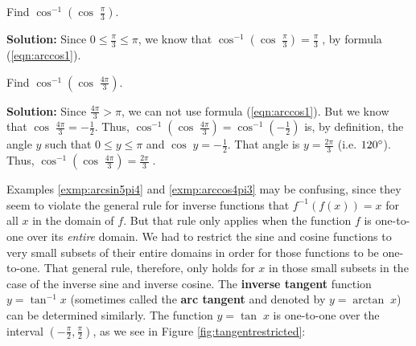 \begin{exmp}
 Find $\cos^{-1} \left(\cos\;\frac{\pi}{3}\right)$.\vspace{1mm}
 \par\noindent\textbf{Solution:} Since $0 \le \frac{\pi}{3} \le \pi$, we know
 that $\cos^{-1} \left(\cos\;\frac{\pi}{3}\right) = \boxed{\frac{\pi}{3}}\;$, by formula
 (\ref{eqn:arccos1}).
\end{exmp}
\begin{exmp}\label{exmp:arccos4pi3}
 Find $\cos^{-1} \left(\cos\;\frac{4\pi}{3}\right)$.\vspace{1mm}
 \par\noindent\textbf{Solution:} Since $\frac{4\pi}{3} > \pi$, we can not use formula
 (\ref{eqn:arccos1}). But we know that $\cos\;\frac{4\pi}{3} = -\frac{1}{2}$. Thus,
 $\cos^{-1} \left(\cos\;\frac{4\pi}{3}\right) = \cos^{-1} \left( -\frac{1}{2} \right)$ is, by
 definition, the angle $y$ such that $0 \le y \le \pi$ and $\cos\;y =
 -\frac{1}{2}$. That angle is $y=\frac{2\pi}{3}$ (i.e. $120^\circ$).
 Thus, $\cos^{-1} \left(\cos\;\frac{4\pi}{3}\right) = \boxed{\tfrac{2\pi}{3}}\;$.
\end{exmp}
\divider
\vspace{1mm}

Examples \ref{exmp:arcsin5pi4} and \ref{exmp:arccos4pi3} may be confusing, since they seem to
violate the general rule for inverse functions that $f^{-1}(f(x)) = x$ for all $x$ in the domain of
$f$. But that rule only applies when the function $f$ is one-to-one over its \emph{entire} domain.
We had to restrict the sine and cosine functions to very small subsets of their entire domains in
order for those functions to be one-to-one. That general rule, therefore, only holds for $x$ in
those small subsets in the case of the inverse sine and inverse cosine.
\newpage
The \textbf{inverse tangent} function $y=\tan^{-1} x$ (sometimes called the
\textbf{arc tangent} and denoted by $y=\arctan\;x$) can be determined similarly.
The function $y=\tan\;x$ is one-to-one over the interval $\left( -\frac{\pi}{2},\frac{\pi}{2}
\right)$, as we see in Figure \ref{fig:tangentrestricted}:

